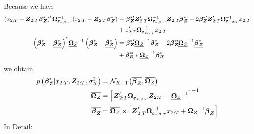 Because we have
\begin{align*}
\left(\Xt-\Zt\bz^*\right)^{\prime}\VCMt^{-1}\left(\Xt-\Zt\bz^*\right)
& =
\bz^{*\prime}\Zt^{\prime}\VCMt^{-1}\Zt\bz^{*}-2\bz^{*\prime}\Zt^{\prime}\VCMt^{-1}\Xt\\
& + \Xt^{\prime}\VCMt^{-1}\Xt
\\
\left(\bz^*-\underline{\bz^*}\right)^{\prime}\Ozprior^{-1}\left(\bz^*-\underline{\bz^*}\right) 
& = 
\bz^{*\prime}\Ozprior^{-1}\bz^*
-2\bz^{*\prime}\Ozprior^{-1}\underline{\bz^*}\\
& +
\underline{\bz^{*\prime}}*\Ozprior^{-1}\underline{\bz^*}
\end{align*}
we obtain
\begin{align*}
p\left(\bz^*\given \Xt,\Zt,\sigma_X^2\right)
&=
\mathcal{N}_{K+1}\left(\overline{\bz},\Ozpost\right)\;\\
\Ozpost
& =
\left[\Zt^{\prime}\VCMt^{-1}\Zt+\Ozprior^{-1}\right]^{-1} \\
\overline{\bz}
& =
\Ozpost\times\left[\Zt^{\prime}\VCMt^{-1}\Xt+\Ozprior^{-1}\bz\right]
\end{align*}
%
%
%
%
%
\clearpage
\underline{In Detail:}
%
%
%
%
%
\clearpage
